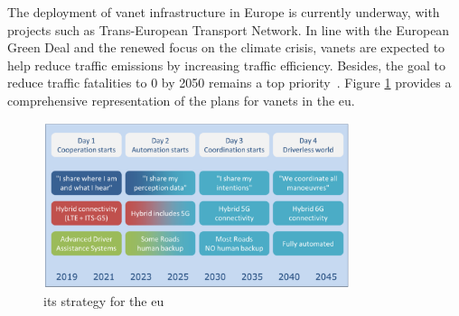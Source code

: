 The deployment of \gls{vanet} infrastructure in Europe is currently underway, with projects such as Trans-European Transport Network. In line with the European Green Deal and the renewed focus on the climate crisis, \glspl{vanet} are expected to help reduce traffic emissions by increasing traffic efficiency. Besides, the goal to reduce traffic fatalities to 0 by 2050 remains a top priority~\cite{lu_pan-european_2019}. Figure \ref{fig:EU_strat} provides a comprehensive representation of the plans for \glspl{vanet} in the \gls{eu}.

\begin{figure}[htbp]
    \centering
    \includegraphics[width=0.8\textwidth]{Chapters/Figures/VANETs/ITS_strategy_EU.png}
   	\caption{\gls{its} strategy for the \gls{eu}~\cite{lu_pan-european_2019}}
   	\label{fig:EU_strat}
\end{figure}




